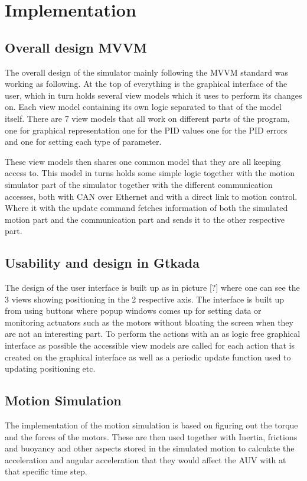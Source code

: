 \section{Implementation}\label{sec:implementation}

\subsection{Overall design MVVM}
The overall design of the simulator mainly following the MVVM standard was working as following. At the top of everything is the graphical interface of the user, which in turn holds several view models which it uses to perform its changes on. Each view model containing its own logic separated to that of the model itself. There are 7 view models that all work on different parts of the program, one for graphical representation one for the PID values one for the PID errors and one for setting each type of parameter.

These view models then shares one common model that they are all keeping access to. This model in turns holds some simple logic together with the motion simulator part of the simulator together with the different communication accesses, both with CAN over Ethernet and with a direct link to motion control. Where it with the update command fetches information of both the simulated motion part and the communication part and sends it to the other respective part.

\subsection{Usability and design in Gtkada}
The design of the user interface is built up as in picture [?] where one can see the 3 views showing positioning in the 2 respective axis. The interface is built up from using buttons where popup windows comes up for setting data or monitoring actuators such as the motors without bloating the screen when they are not an interesting part. To perform the actions with an as logic free graphical interface as possible the accessible view models are called for each action that is created on the graphical interface as well as a periodic update function used to updating positioning etc.

\subsection{Motion Simulation}
The implementation of the motion simulation is based on figuring out the torque and the forces of the motors. These are then used together with Inertia, frictions and buoyancy and other aspects stored in the simulated motion to calculate the acceleration and angular acceleration that they would affect the AUV with at that specific time step.
 
